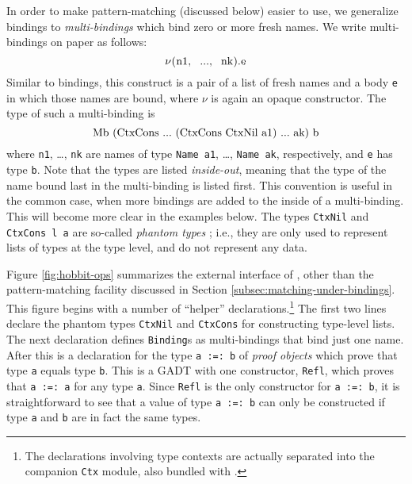\documentclass[natbib]{sigplanconf}
\begin{document}
In order to make pattern-matching (discussed below) easier to use, we
generalize bindings to \emph{multi-bindings} which bind zero or more
fresh names. We write multi-bindings on paper as follows:
\[
\nu\text{\lstinline{(n1, ..., nk).e}}
\]
Similar to bindings, this construct is a pair of a list of fresh names
and a body \lstinline{e} in which those names are bound, where
$\nu$ is again an opaque constructor. The type of such a multi-binding
is
\[
\text{\lstinline{Mb (CtxCons ... (CtxCons CtxNil a1) ... ak) b}}
\]
where \lstinline{n1}, \ldots, \lstinline{nk} are names of type
\lstinline{Name a1}, \ldots, \lstinline{Name ak}, respectively, and
\lstinline{e} has type \lstinline{b}.  Note that the types are listed
\emph{inside-out}, meaning that the type of the name bound last in the
multi-binding is listed first. This convention is useful in the common
case, when more bindings are added to the inside of a multi-binding.
This will become more clear in the examples below.  The types
\lstinline{CtxNil} and \lstinline{CtxCons l a} are so-called
\emph{phantom types} \cite{leijen99}; i.e., they are only used to
represent lists of types at the type level, and do not represent any
data.


Figure \ref{fig:hobbit-ops} summarizes the external interface of
\ourlib, other than the pattern-matching facility discussed in Section
\ref{subsec:matching-under-bindings}. This figure begins with a number
of ``helper'' declarations.\footnote{The declarations involving
  type contexts are actually separated into the companion
  \lstinline{Ctx} module, also bundled with \ourlib.}
The first two lines declare the phantom types
\lstinline{CtxNil} and \lstinline{CtxCons} for constructing type-level
lists. The next declaration defines \lstinline{Binding}s as
multi-bindings that bind just one name.  After this is a declaration
for the type
\lstinline{a :=: b} of \emph{proof objects} which prove that type
\lstinline{a} equals type \lstinline{b}. This is a GADT with one
constructor, \lstinline{Refl}, which proves that \lstinline{a :=: a}
for any type \lstinline{a}.
Since \lstinline{Refl} is the only constructor for
\lstinline{a :=: b}, it is straightforward to see that a value of type
\lstinline{a :=: b} can only be constructed if type \lstinline{a} and
\lstinline{b} are in fact the same types.
\end{document}
